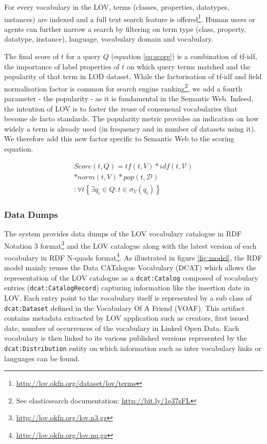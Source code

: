 \documentclass{iosart2c}
\begin{document}
For every vocabulary in the LOV, terms (classes, properties, datatypes, instances) are indexed and a full text search feature is offered\footnote{\url{http://lov.okfn.org/dataset/lov/terms}}. Human users or agents can further narrow a search by filtering on term type (class, property, datatype, instance), language, vocabulary domain and vocabulary.

The final score of $t$ for a query $Q$ (equation \ref{eq:score}) is a combination of tf-idf, the importance of label properties of $t$ on which query terms matched and the popularity of that term in LOD dataset. While the factorisation of tf-idf and field normalisation factor is common for search engine ranking\footnote{See elasticsearch documentation: \url{http://bit.ly/1e37sFL}}, we add a fourth parameter - the popularity - as it is fundamental in the Semantic Web. Indeed, the intention of LOV is to foster the reuse of consensual vocabularies that become de facto standards. The popularity metric provides an indication on how widely a term is already used (in frequency and in number of datasets using it). We therefore add this new factor specific to Semantic Web to the scoring equation.
 

\begin{equation}\label{eq:score}
\begin{split}
Score(t,Q) =tf(t,V) * idf(t,\mathcal{V}) \\
* norm(t,V) * pop(t,\mathcal{D})\\
: \forall t\left\{\exists q_i \in Q: t \in \sigma_V(q_i)\right\}
\end{split}
\end{equation}





\subsubsection{Data Dumps}
The system provides data dumps of the LOV vocabulary catalogue in RDF Notation 3 format\footnote{\url{http://lov.okfn.org/lov.n3.gz}} and the LOV catalogue along with the latest version of each vocabulary in RDF N-quads format\footnote{\url{http://lov.okfn.org/lov.nq.gz}}. As illustrated in figure \ref{fig:model}, the RDF model mainly reuses the Data CATalogue Vocabulary (DCAT) which allows the representation of the LOV catalogue as a \texttt{dcat:Catalog} composed of vocabulary entries (\texttt{dcat:CatalogRecord}) capturing information like the insertion date in LOV. Each entry point to the vocabulary itself is represented by a sub class of \texttt{dcat:Dataset} defined in the Vocabulary Of A Friend (VOAF). This artifact contains metadata extracted by LOV application such as creators, first issued date, number of occurrences of the vocabulary in Linked Open Data. Each vocabulary is then linked to its various published versions represented by the \texttt{dcat:Distribution} entity on which information such as inter vocabulary links or languages can be found.
\end{document}
